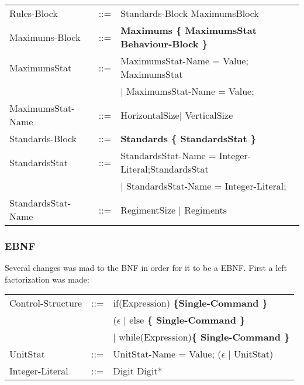 \begin{tabular}{ l l l }
			Rules-Block		   &	::=	 & Standards-Block MaximumsBlock 				\\
			Maximums-Block	   &	::=	 & \bf{Maximums} \bf{\{} MaximumsStat Behaviour-Block \bf{\}}	\\
			MaximumsStat	   &	::=  & MaximumsStat-Name = Value; MaximumsStat  \\
							   &		 & $\mid$ MaximumsStat-Name = Value;   \\
			MaximumsStat-Name  &	::=  & HorizontalSize$\mid$ VerticalSize					\\
			Standards-Block	   &    ::=  & \bf{Standards} \bf{\{ } StandardsStat \bf{\} }	\\
			StandardsStat	   & 	::=	 & StandardsStat-Name = Integer-Literal;StandardsStat \\
							   &		 & $\mid$ StandardsStat-Name = Integer-Literal; \\
			StandardsStat-Name & 	::=	 & RegimentSize	$\mid$ Regiments \\
		\end{tabular}
		
	\subsubsection{EBNF}
		Several changes was mad to the BNF in order for it to be a EBNF. First a left factorization was made:
		\begin{tabular}{ l l l }
			Control-Structure  &  	::=  & if(Expression) \bf{\{}Single-Command \bf{\}}  \\
							   &  	     & ($\epsilon$ $\mid$ else \bf{\{ }Single-Command \bf{\} } \\					   
							   &   		 & $\mid$ while(Expression)\bf{\{ } Single-Command \bf{\}} \\
	  		UnitStat		   &	::=  & UnitStat-Name = Value; ($\epsilon$ $\mid$ UnitStat) \\
			Integer-Literal    &	::=  & Digit Digit* 
			
								
		\end{tabular}
							   
							   